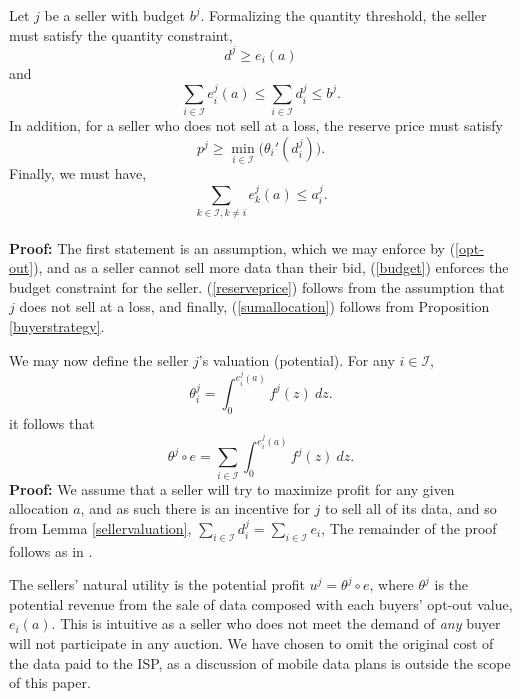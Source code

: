 \documentclass[12pt]{article}
\theoremstyle{definition}
\newcommand{\mcI}{\mathcal{I}}
\begin{document}
\begin{multicols}{2}
{
\label{constraints}
Let $j$ be a seller with budget $b^j$.
Formalizing the quantity threshold, the seller must satisfy the quantity
constraint, 
\begin{equation}\label{quantity}
    d^j \ge e_i(a)
\end{equation}
and
\begin{equation}\label{budget}
    \displaystyle\sum_{i\in\mcI} e_i^j(a) \le \sum_{i\in\mcI} d^j_i \le b^j.
\end{equation}
In addition, for a seller who does not sell at a loss, the reserve price must
satisfy 
\begin{equation}\label{reserveprice}
   p^j \ge \min_{i\in\mcI}\big({\theta_i}'(d_i^j)\big).
\end{equation}
Finally, we must have,
\begin{equation}\label{sumallocation}
    \displaystyle\sum_{k\in \mcI, k\ne i} e_k^j(a) \le a_i^j.
\end{equation}
}\\
\textbf{Proof:}
The first statement is an assumption, which we may enforce by (\ref{opt-out}),
and as a seller cannot sell more data than their bid, (\ref{budget}) enforces
the budget constraint for the seller. (\ref{reserveprice})
follows from the assumption that $j$ does not sell at a loss, and finally, (\ref{sumallocation})
follows from Proposition \ref{buyerstrategy}. 

We may now define the seller $j$'s valuation (potential). 
{
\label{sellervaluation}
For any $i\in\mcI$, 
\begin{equation}\label{singlevaluation}
    \theta_i^j = \int_0^{e_i^j(a)} f^j(z) \ dz.
\end{equation}
it follows that 
\begin{equation}\label{valuation}
    \theta^j \circ e = \displaystyle\sum_{i\in\mcI}
 \int_0^{e_i^j(a)} f^j(z) \ dz.
\end{equation}
}
\textbf{Proof:} 
We assume that a seller will try to maximize profit for any given allocation $a$, and
as such there is an incentive for $j$ to sell all of its data, and so from Lemma
\ref{sellervaluation},  $\sum_{i\in{\mcI}} d_i^j = 
\sum_{i\in\mcI} e_i$,
The remainder of the proof follows as in \cite{semret}.

The sellers' natural utility is the potential
profit $u^j = \theta^j\circ e$, where $\theta^j$ is the
potential revenue from the sale of data composed with each buyers' opt-out value, $e_i(a)$. 
This is intuitive as a seller who does not meet the demand of \emph{any} buyer will not
participate in any auction. We have chosen to omit the original cost of the data
paid to the ISP, as a discussion of mobile data plans is outside the scope of this
paper. 


\end{multicols}
\end{document}
